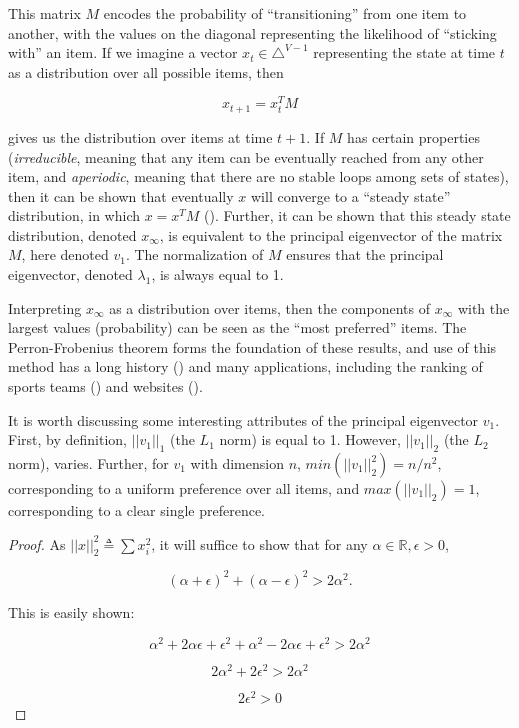 This matrix $M$ encodes the probability of ``transitioning'' from one item to another, with the values on the diagonal representing the likelihood of ``sticking with'' an item. 
If we imagine a vector $x_t \in \triangle^{V-1}$ representing the state at time $t$ as a distribution over all possible items, then

\[
x_{t+1} = x_t^TM
\]

gives us the distribution over items at time $t+1$.
If $M$ has certain properties (\textit{irreducible}, meaning that any item can be eventually reached from any other item, and \textit{aperiodic}, meaning that there are no stable loops among sets of states), then it can be shown that eventually $x$ will converge to a ``steady state'' distribution, in which $x = x^TM$ (\cite{lin:2016}).
Further, it can be shown that this steady state distribution, denoted $x_{\infty}$, is equivalent to the principal eigenvector of the matrix $M$, here denoted $v_1$.
The normalization of $M$ ensures that the principal eigenvector, denoted $\lambda_1$, is always equal to 1.

Interpreting $x_{\infty}$ as a distribution over items, then the components of $x_{\infty}$ with the largest values (probability) can be seen as the ``most preferred'' items.
The Perron-Frobenius theorem forms the foundation of these results, and use of this method has a long history (\cite{keener:1993}) and many applications, including the ranking of sports teams (\cite{landau:1915}) and websites (\cite{brin}).

\bigskip

It is worth discussing some interesting attributes of the principal eigenvector $v_1$.
First, by definition, $||v_1||_1$ (the $L_1$ norm) is equal to 1.
However, $||v_1||_2$ (the $L_2$ norm), varies.
Further, for $v_1$ with dimension $n$, $min(||v_1||_2^2) = n/n^2$, corresponding to a uniform preference over all items, and $max(||v_1||_2) = 1$, corresponding to a clear single preference.

\begin{proof}
As $||x||_2^2 \triangleq \sum x_i^2$, it will suffice to show that for any $\alpha \in \mathbb{R}, \epsilon > 0$,

\[
(\alpha + \epsilon)^2
+ (\alpha - \epsilon)^2
> 2\alpha^2.
\]

This is easily shown:

\[
\alpha^2 + 2\alpha\epsilon + \epsilon^2
+ \alpha^2 - 2\alpha\epsilon + \epsilon^2
 > 2\alpha^2
\]

\[
2\alpha^2 + 2\epsilon^2
 > 2\alpha^2
\]

\[
2\epsilon^2 > 0
\]
\end{proof}

